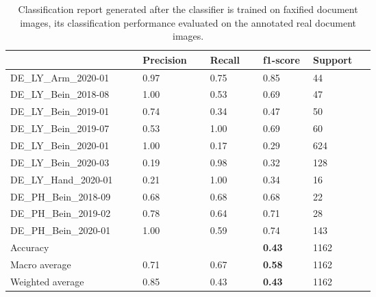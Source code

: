 \begin{center}
\begin{table}[H]
    \begin{center}
    \begin{tabular}{P{0.22\linewidth} P{0.10\linewidth} P{0.10\linewidth} P{0.10\linewidth} P{0.10\linewidth}} 
        \toprule
            & Precision & Recall & f1-score & Support\\[0.0ex] 
        \midrule
        DE\_LY\_Arm\_2020-01 & 0.97 & 0.75 & 0.85 & 44\\[0.0ex]
        \midrule
        DE\_LY\_Bein\_2018-08 & 1.00 & 0.53 & 0.69 & 47\\[0.0ex]
        \midrule
        DE\_LY\_Bein\_2019-01 & 0.74 & 0.34 & 0.47 & 50\\[0.0ex]
        \midrule
        DE\_LY\_Bein\_2019-07 & 0.53 & 1.00 & 0.69 & 60\\[0.0ex]
        \midrule
        DE\_LY\_Bein\_2020-01 & 1.00 & 0.17 & 0.29 & 624\\[0.0ex]
        \midrule
        DE\_LY\_Bein\_2020-03 & 0.19 & 0.98 & 0.32 & 128\\[0.0ex]
        \midrule
        DE\_LY\_Hand\_2020-01 & 0.21 & 1.00 & 0.34 & 16\\[0.0ex]
        \midrule
        DE\_PH\_Bein\_2018-09 & 0.68 & 0.68 & 0.68 & 22\\[0.0ex]
        \midrule
        DE\_PH\_Bein\_2019-02 & 0.78 & 0.64 & 0.71 & 28\\[0.0ex]
        \midrule
        DE\_PH\_Bein\_2020-01 & 1.00 & 0.59 & 0.74 & 143\\[0.0ex]
        \midrule
        \midrule
        Accuracy              &      &      & \bf{0.43} & 1162\\[0.0ex]
        Macro average             & 0.71 & 0.67 & \bf{0.58} & 1162\\[0.0ex]
        Weighted average          & 0.85 & 0.43 & \bf{0.43} & 1162\\[0.0ex]

        \bottomrule
    \end{tabular}
    \caption[Classification report generated after the classifier is trained on faxified document images, its classification performance evaluated on the annotated real document images.]{Classification report generated after the classifier is trained on faxified document images, its classification performance evaluated on the annotated real document images.}
    \label{table:FaxifiedClassificationReport}
    \end{center}
\end{table}
\end{center}







